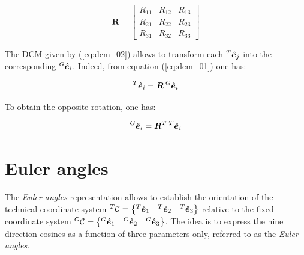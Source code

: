 \begin{appendices}
\begin{equation}\label{eq:dcm_02}
    \bm{R} = \begin{bmatrix}R_{11} & R_{12} & R_{13}\\
    R_{21} & R_{22} & R_{23}\\
    R_{31} & R_{32} & R_{33}\end{bmatrix}
\end{equation}

The DCM given by (\ref{eq:dcm_02}) allows to transform each ${^T}{}\hat{\bm{e}}_j$ into the corresponding ${^G}{}\hat{\bm{e}}_i$. Indeed, from equation (\ref{eq:dcm_01}) one has:

\begin{equation}\label{eq:dcm_03}
    {^T}{}\hat{\bm{e}}_i = \bm{R}\: {^G}{}\hat{\bm{e}}_i
\end{equation}

To obtain the opposite rotation, one has:

\begin{equation}\label{eq:dcm_04}
    {^G}{}\hat{\bm{e}}_i = \bm{R}^T\: {^T}{}\hat{\bm{e}}_i 
\end{equation}


\section{Euler angles}
The \textit{Euler angles} representation allows to establish the orientation of the technical coordinate system ${^T}{}\mathcal{C} = \begin{Bmatrix} {^T}{}\hat{\bm{e}}_1 & {^T}{}\hat{\bm{e}}_2 & {^T}{}\hat{\bm{e}}_3 \end{Bmatrix}$ relative to the fixed coordinate system ${^G}{}\mathcal{C} = \begin{Bmatrix} {^G}{}\hat{\bm{e}}_1 & {^G}{}\hat{\bm{e}}_2 & {^G}{}\hat{\bm{e}}_3 \end{Bmatrix}$. The idea is to express the nine direction cosines as a function of three parameters only, referred to as the \textit{Euler angles}.


\end{appendices}
